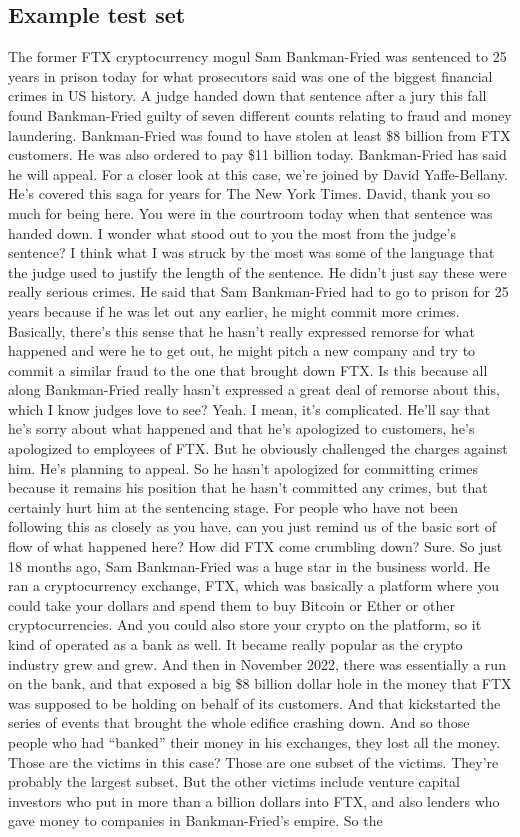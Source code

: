 \subsection{Example test set}
The former FTX cryptocurrency mogul Sam Bankman-Fried was sentenced to 25 years in prison today for what prosecutors said was one of the biggest financial crimes in US history. A judge handed down that sentence after a jury this fall found Bankman-Fried guilty of seven different counts relating to fraud and money laundering. Bankman-Fried was found to have stolen at least \$8 billion from FTX customers. He was also ordered to pay \$11 billion today. Bankman-Fried has said he will appeal. For a closer look at this case, we’re joined by David Yaffe-Bellany. He’s covered this saga for years for The New York Times. David, thank you so much for being here. You were in the courtroom today when that sentence was handed down. I wonder what stood out to you the most from the judge’s sentence? I think what I was struck by the most was some of the language that the judge used to justify the length of the sentence. He didn’t just say these were really serious crimes. He said that Sam Bankman-Fried had to go to prison for 25 years because if he was let out any earlier, he might commit more crimes. Basically, there’s this sense that he hasn’t really expressed remorse for what happened and were he to get out, he might pitch a new company and try to commit a similar fraud to the one that brought down FTX. Is this because all along Bankman-Fried really hasn’t expressed a great deal of remorse about this, which I know judges love to see? Yeah. I mean, it’s complicated. He’ll say that he’s sorry about what happened and that he’s apologized to customers, he’s apologized to employees of FTX. But he obviously challenged the charges against him. He’s planning to appeal. So he hasn’t apologized for committing crimes because it remains his position that he hasn’t committed any crimes, but that certainly hurt him at the sentencing stage. For people who have not been following this as closely as you have, can you just remind us of the basic sort of flow of what happened here? How did FTX come crumbling down? Sure. So just 18 months ago, Sam Bankman-Fried was a huge star in the business world. He ran a cryptocurrency exchange, FTX, which was basically a platform where you could take your dollars and spend them to buy Bitcoin or Ether or other cryptocurrencies. And you could also store your crypto on the platform, so it kind of operated as a bank as well. It became really popular as the crypto industry grew and grew. And then in November 2022, there was essentially a run on the bank, and that exposed a big \$8 billion dollar hole in the money that FTX was supposed to be holding on behalf of its customers. And that kickstarted the series of events that brought the whole edifice crashing down. And so those people who had “banked” their money in his exchanges, they lost all the money. Those are the victims in this case? Those are one subset of the victims. They’re probably the largest subset. But the other victims include venture capital investors who put in more than a billion dollars into FTX, and also lenders who gave money to companies in Bankman-Fried’s empire. So the 